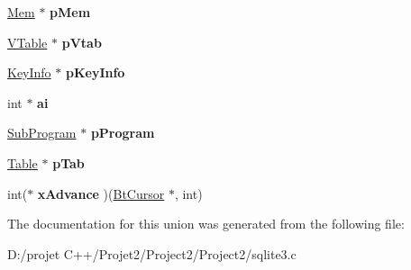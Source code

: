 \begin{DoxyCompactItemize}
\mbox{\hyperlink{structsqlite3__value}{Mem}} $\ast$ {\bfseries p\+Mem}
\item 
\mbox{\label{union_vdbe_op_1_1p4union_a25abd8bcf2df2f591e2dc6c377f8f427}} 
\mbox{\hyperlink{struct_v_table}{V\+Table}} $\ast$ {\bfseries p\+Vtab}
\item 
\mbox{\label{union_vdbe_op_1_1p4union_acda5935a8938d01e523d0eb79b0c1e72}} 
\mbox{\hyperlink{struct_key_info}{Key\+Info}} $\ast$ {\bfseries p\+Key\+Info}
\item 
\mbox{\label{union_vdbe_op_1_1p4union_a1bd30fbce8b173d7270d04dc714863f3}} 
int $\ast$ {\bfseries ai}
\item 
\mbox{\label{union_vdbe_op_1_1p4union_ac72a98a54ea6ddd7b168af47fab46a41}} 
\mbox{\hyperlink{struct_sub_program}{Sub\+Program}} $\ast$ {\bfseries p\+Program}
\item 
\mbox{\label{union_vdbe_op_1_1p4union_af846307afcc87ba2ca357108d3c48edf}} 
\mbox{\hyperlink{struct_table}{Table}} $\ast$ {\bfseries p\+Tab}
\item 
\mbox{\label{union_vdbe_op_1_1p4union_a41019a55e48410473fb18f8fb4f51169}} 
int($\ast$ {\bfseries x\+Advance} )(\mbox{\hyperlink{struct_bt_cursor}{Bt\+Cursor}} $\ast$, int)
\end{DoxyCompactItemize}


The documentation for this union was generated from the following file\+:\begin{DoxyCompactItemize}
\item 
D\+:/projet C++/\+Projet2/\+Project2/\+Project2/sqlite3.\+c\end{DoxyCompactItemize}
